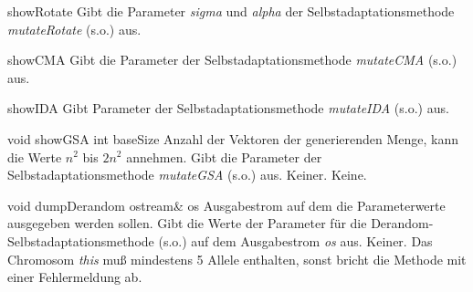 \documentclass{report}
\begin{document}
\setNormalInstance
\printEmptyMethod
{showRotate}
{Gibt die Parameter {\em sigma} und {\em alpha} der Selbstadaptationsmethode 
 {\em mutateRotate} (s.o.) aus.}

\vspace{4ex}

\setNormalInstance
\printEmptyMethod
{showCMA}
{Gibt die Parameter der Selbstadaptationsmethode {\em mutateCMA} (s.o.)
 aus.}

\vspace{4ex}

\setNormalInstance
\printEmptyMethod
{showIDA}
{Gibt Parameter der Selbstadaptationsmethode {\em mutateIDA} (s.o.)
 aus.}

\vspace{4ex}

\setNormalInstance
\printMethodWithOneParam
{void}
{showGSA}
{int}
{baseSize}
{Anzahl der Vektoren der generierenden Menge, kann die Werte $n^2$ bis 
 $2n^2$ annehmen.}
{Gibt die Parameter der Selbstadaptationsmethode {\em mutateGSA} (s.o.)
 aus.}
{Keiner.}
{Keine.}

\newpage

\setConstInstance
\printMethodWithOneParam
{void}
{dumpDerandom}
{ostream\&}
{os}
{Ausgabestrom auf dem die Parameterwerte ausgegeben werden sollen.}
{Gibt die Werte der Parameter f\"ur die Derandom-Selbstadaptationsmethode
 (s.o.) auf dem Ausgabestrom {\em os} aus.}
{Keiner.}
{Das Chromosom {\em this} mu{\ss} mindestens 5 Allele enthalten,
 sonst bricht die Methode mit einer Fehlermeldung ab.}

\newpage

\setNormalInstance

\noindent
\end{document}
